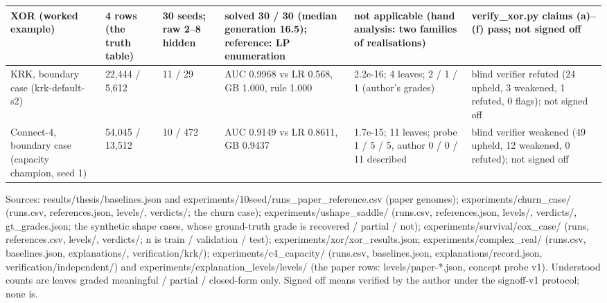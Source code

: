 \begin{table}[htbp]
\begin{tabular}{p{3.2cm}p{1.6cm}p{1.4cm}p{3.6cm}p{3.6cm}p{3.2cm}}
XOR (worked example) & 4 rows (the truth table) & 30 seeds; raw 2--8 hidden & solved 30 / 30 (median generation 16.5); reference: LP enumeration & not applicable (hand analysis: two families of realisations) & verify\_xor.py claims (a)--(f) pass; not signed off \\
\midrule
KRK, boundary case (krk-default-s2) & 22,444 / 5,612 & 11 / 29 & AUC 0.9968 vs LR 0.568, GB 1.000, rule 1.000 & 2.2e-16; 4 leaves; 2 / 1 / 1 (author's grades) & blind verifier refuted (24 upheld, 3 weakened, 1 refuted, 0 flags); not signed off \\
Connect-4, boundary case (capacity champion, seed 1) & 54,045 / 13,512 & 10 / 472 & AUC 0.9149 vs LR 0.8611, GB 0.9437 & 1.7e-15; 11 leaves; probe 1 / 5 / 5, author 0 / 0 / 11 described & blind verifier weakened (49 upheld, 12 weakened, 0 refuted); not signed off \\
\bottomrule
\end{tabular}
\begin{flushleft}\footnotesize Sources: results/thesis/baselines.json and experiments/10seed/runs\_paper\_reference.csv (paper genomes); experiments/churn\_case/ (runs.csv, references.json, levels/, verdicts/; the churn case); experiments/ushape\_saddle/ (runs.csv, references.json, levels/, verdicts/, gt\_grades.json; the synthetic shape cases, whose ground-truth grade is recovered / partial / not); experiments/survival/cox\_case/ (runs, references.csv, levels/, verdicts/; n is train / validation / test); experiments/xor/xor\_results.json; experiments/complex\_real/ (runs.csv, baselines.json, explanations/, verification/krk/); experiments/c4\_capacity/ (runs.csv, baselines.json, explanations/record.json, verification/independent/) and experiments/explanation\_levels/levels/ (the paper rows: levels/paper-*.json, concept probe v1). Understood counts are leaves graded meaningful / partial / closed-form only. Signed off means verified by the author under the signoff-v1 protocol; none is.\end{flushleft}
\end{table}
